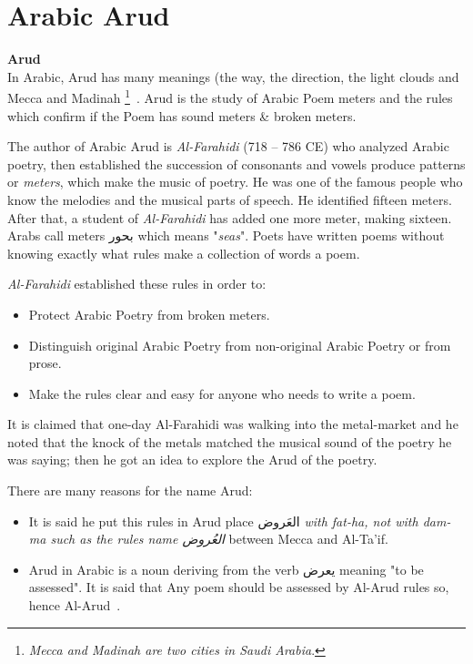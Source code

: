 \section{Arabic Arud}
\begin{definition}\label{def:arud}
  \textbf{Arud} \hfill \\
  In Arabic, Arud has many meanings (the way, the direction, the light clouds and Mecca and Madinah \footnote{\textit{Mecca and Madinah are two cities in  Saudi Arabia}.}~\cite{AlQuaed}. Arud is the study of Arabic Poem meters and the rules which confirm if the Poem has sound meters \& broken meters.
\end{definition}

The author of Arabic Arud  is \textit{Al-Farahidi} (718 – 786 CE) who analyzed Arabic poetry, then established the succession of consonants and vowels produce patterns or \textit{meters}, which make the music of poetry. He was one of the famous people who know the melodies and the musical parts of speech. He identified fifteen meters.  After that, a student of \textit{Al-Farahidi} has added one more meter, making sixteen. Arabs call meters \textarabic{بحور} which means "\textit{seas}". Poets have written poems without knowing exactly what rules make a collection of words a poem.

\textit{Al-Farahidi} established these rules in order to:
\begin{itemize}
  \item Protect Arabic Poetry from broken meters.
  \item Distinguish original Arabic Poetry from non-original Arabic Poetry or from prose.
  \item Make the rules clear and easy for anyone who needs to write a poem.
\end{itemize}

It is claimed that one-day Al-Farahidi was walking into the metal-market and he noted that the knock of the metals matched the musical sound of the poetry he was saying; then he got an idea to explore the Arud of the poetry.

There are many reasons for the name Arud:
\begin{itemize}
  \item It is said he put this rules in Arud place \textarabic{العَروض} \textit{with fat-ha, not with dam-ma such as the rules name \textarabic{العُروض} } between Mecca and Al-Ta'if\cite{AlQuaed}.
  \item Arud in Arabic is a noun deriving from the verb \textarabic{يعرض} meaning "to be assessed". It is said that Any poem should be assessed by Al-Arud rules so, hence Al-Arud~\cite{Alkafi1994}.
\end{itemize}


